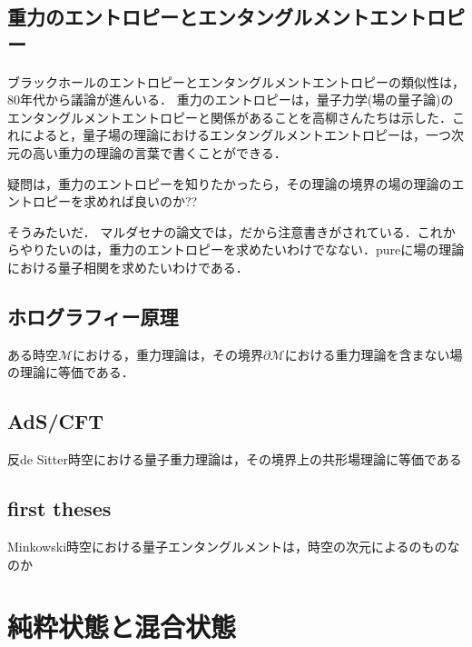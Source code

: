 \subsection{重力のエントロピーとエンタングルメントエントロピー}
ブラックホールのエントロピーとエンタングルメントエントロピーの類似性は，80年代から議論が進んいる．
重力のエントロピーは，量子力学(場の量子論)のエンタングルメントエントロピーと関係があることを高柳さんたちは示した．これによると，量子場の理論におけるエンタングルメントエントロピーは，一つ次元の高い重力の理論の言葉で書くことができる．


疑問は，重力のエントロピーを知りたかったら，その理論の境界の場の理論のエントロピーを求めれば良いのか??

そうみたいだ．
マルダセナの論文では，だから注意書きがされている．これからやりたいのは，重力のエントロピーを求めたいわけでなない．pureに場の理論における量子相関を求めたいわけである．


\subsection{ホログラフィー原理}
ある時空$\mathcal{M}$における，重力理論は，その境界$\mathcal{\partial M}$における重力理論を含まない場の理論に等価である．
\subsection{AdS/CFT}
反de Sitter時空における量子重力理論は，その境界上の共形場理論に等価である
\subsection{first theses}
Minkowski時空における量子エンタングルメントは，時空の次元によるのものなのか
\section{純粋状態と混合状態}
